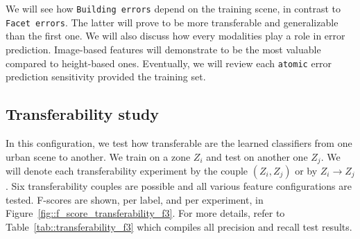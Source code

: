     We will see how \texttt{Building errors} depend on the training scene, in contrast to \texttt{Facet errors}.
    The latter will prove to be more transferable and generalizable than the first one.
    We will also discuss how every modalities play a role in error prediction.
    Image-based features will demonstrate to be the most valuable compared to height-based ones.
    Eventually, we will review each \texttt{atomic} error prediction sensitivity provided the training set.

    \subsection{Transferability study}
        \label{subsec::more_experiments::scalability::transferability}
        In this configuration, we test how transferable are the learned classifiers from one urban scene to another.
        We train on a zone $Z_i$ and test on another one $Z_j$.
        We will denote each transferability experiment by the couple $(Z_i, Z_j)$ or by $Z_i \rightarrow Z_j$.
        Six transferability couples are possible and all various feature configurations are tested.
        F-scores are shown, per label, and per experiment, in Figure~\ref{fig::f_score_transferability_f3}.
        For more details, refer to Table~\ref{tab::transferability_f3} which compiles all precision and recall test results.\\
        
        \begin{figure}[htbp]
        \end{figure}

